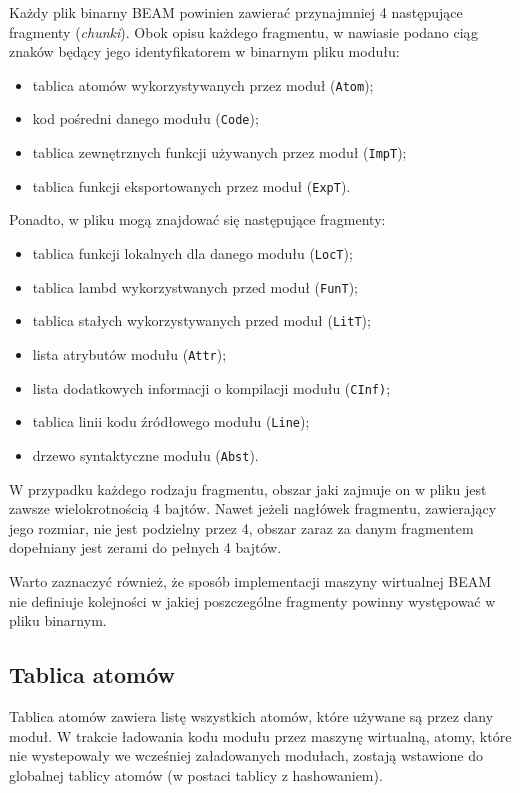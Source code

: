 Każdy plik binarny BEAM powinien zawierać przynajmniej 4 następujące fragmenty (\emph{chunki}).
Obok opisu każdego fragmentu, w nawiasie podano ciąg znaków będący jego identyfikatorem w binarnym pliku modułu:
\begin{itemize}
\item tablica atomów wykorzystywanych przez moduł (\texttt{Atom});
\item kod pośredni danego modułu (\texttt{Code});
\item tablica zewnętrznych funkcji używanych przez moduł (\texttt{ImpT});
\item tablica funkcji eksportowanych przez moduł (\texttt{ExpT}).
\end{itemize}

Ponadto, w pliku mogą znajdować się następujące fragmenty:
\begin{itemize}
\item tablica funkcji lokalnych dla danego modułu (\texttt{LocT});
\item tablica lambd wykorzystwanych przed moduł (\texttt{FunT});
\item tablica stałych wykorzystywanych przed moduł (\texttt{LitT});
\item lista atrybutów modułu (\texttt{Attr});
\item lista dodatkowych informacji o kompilacji modułu (\texttt{CInf)};
\item tablica linii kodu źródłowego modułu (\texttt{Line});
\item drzewo syntaktyczne modułu (\texttt{Abst}).
\end{itemize}

W przypadku każdego rodzaju fragmentu, obszar jaki zajmuje on w pliku jest zawsze wielokrotnością 4 bajtów. Nawet jeżeli nagłówek fragmentu, zawierający jego rozmiar, nie jest podzielny przez 4, obszar zaraz za danym fragmentem dopełniany jest zerami do pełnych 4 bajtów.

Warto zaznaczyć również, że sposób implementacji maszyny wirtualnej BEAM nie definiuje kolejności w jakiej poszczególne fragmenty powinny występować w pliku binarnym.

\subsection{Tablica atomów}
Tablica atomów zawiera listę wszystkich atomów, które używane są przez dany moduł. W trakcie ładowania kodu modułu przez maszynę wirtualną, atomy, które nie wystepowały we wcześniej załadowanych modułach, zostają wstawione do globalnej tablicy atomów (w postaci tablicy z hashowaniem).

